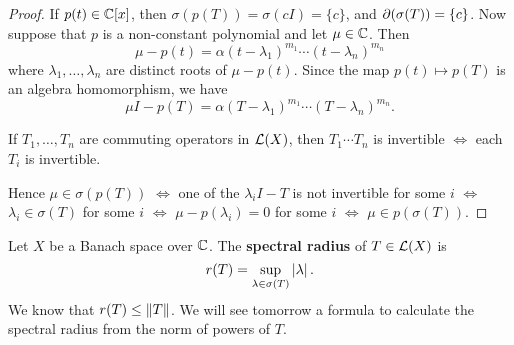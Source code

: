 \begin{proof}
  If $p(t) \in \mathbb{C}[x]$, then $\sigma(p(T))=\sigma(cI) = \{c\}$, and $\partial(\sigma(T))=\{c\}$.
  Now suppose that $p$ is a non-constant polynomial and let $\mu \in \mathbb{C}$.
  Then
  \[ \mu-p(t) = \alpha(t-\lambda_1)^{m_1}\cdots(t-\lambda_n)^{m_n} \]
  where $\lambda_1,\ldots,\lambda_n$ are distinct roots of $\mu-p(t)$.
  Since the map $p(t) \mapsto p(T)$ is an algebra homomorphism, we have
  \[ \mu I-p(T) = \alpha(T-\lambda_1)^{m_1}\cdots(T-\lambda_n)^{m_n}. \]

  \begin{exer}
    If $T_1,\ldots,T_n$ are commuting operators in $\mathcal{L}(X)$, then $T_1 \cdots T_n$ is invertible $\iff$ each $T_i$ is invertible.
  \end{exer}

  Hence $\mu \in \sigma(p(T))$ $\iff$ one of the $\lambda_i I-T$ is not invertible for some $i$ $\iff$ $\lambda_i \in \sigma(T)$ for some $i$ $\iff$ $\mu-p(\lambda_i)=0$ for some $i$ $\iff$ $\mu \in p(\sigma(T))$.
\end{proof}

\begin{defn}
  Let $X$ be a Banach space over $\mathbb{C}$. The \textbf{spectral radius} of $T \in \mathcal{L}(X)$ is
  \[ r(T) = \sup_{\lambda\in\sigma(T)}\left\lvert \lambda \right\rvert. \]
  We know that $r(T) \leq \left\lVert T \right\rVert$.
  We will see tomorrow a formula to calculate the spectral radius from the norm of powers of $T$.
\end{defn}

